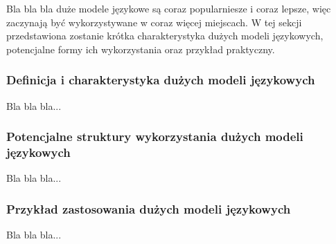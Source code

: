 Bla bla bla duże modele językowe są coraz popularniesze i coraz lepsze, więc zaczynają być
wykorzystywane w coraz więcej miejscach. W tej sekcji przedstawiona zostanie krótka charakterystyka
dużych modeli językowych, potencjalne formy ich wykorzystania oraz przykład praktyczny.

\subsubsection*{Definicja i charakterystyka dużych modeli językowych}

Bla bla bla...

\subsubsection*{Potencjalne struktury wykorzystania dużych modeli językowych}

Bla bla bla...

\subsubsection*{Przykład zastosowania dużych modeli językowych}

Bla bla bla...